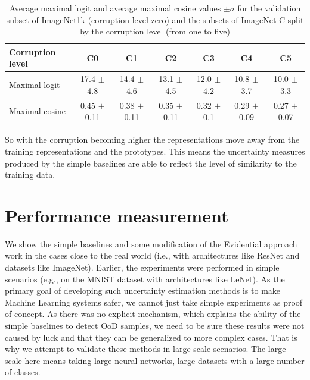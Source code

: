 \documentclass{article}
\begin{document}
\begin{table}[H]
  \caption{Average maximal logit and average maximal cosine values $\pm \sigma$ for the validation subset of ImageNet1k (corruption level zero) and the subsets of ImageNet-C split by the corruption level (from one to five)}
  \label{table:max_logit_cosine}
  \vskip 0.15in
  \begin{center}
  \begin{small}
    \begin{tabular}{ l | c c c c c c }
      \toprule
      Corruption level & C0 & C1 & C2 & C3 & C4 & C5 \\
      \midrule
      Maximal logit
      & 17.4 {\tiny $\pm$ 4.8} & 14.4 {\tiny $\pm$ 4.6} & 13.1 {\tiny $\pm$ 4.5} & 12.0 {\tiny $\pm$ 4.2} & 10.8 {\tiny $\pm$ 3.7} & 10.0 {\tiny $\pm$ 3.3} \\
      Maximal cosine
      & 0.45 {\tiny $\pm$ 0.11} & 0.38 {\tiny $\pm$ 0.11} & 0.35 {\tiny $\pm$ 0.11} & 0.32 {\tiny $\pm$ 0.1} & 0.29 {\tiny $\pm$ 0.09} & 0.27 {\tiny $\pm$ 0.07} \\
      \bottomrule
    \end{tabular}
  \end{small}
  \end{center}
\end{table}

So with the corruption becoming higher the representations move away from the training representations and the prototypes.
This means the uncertainty measures produced by the simple baselines are able to reflect the level of similarity to the training data.

\section{Performance measurement}
\label{section:experiments}
We show the simple baselines and some modification of the Evidential approach work in the cases close to the real world (i.e., with architectures like ResNet and datasets like ImageNet).
Earlier, the experiments were performed in simple scenarios (e.g., on the MNIST dataset with architectures like LeNet).
As the primary goal of developing such uncertainty estimation methods is to make Machine Learning systems safer, we cannot just take simple experiments as proof of concept.
As there was no explicit mechanism, which explains the ability of the simple baselines to detect OoD samples, we need to be sure these results were not caused by luck and that they can be generalized to more complex cases.
That is why we attempt to validate these methods in large-scale scenarios.
The large scale here means taking large neural networks, large datasets with a large number of classes.
\end{document}
